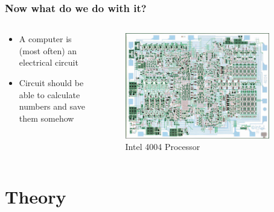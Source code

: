 \documentclass{beamer}
\begin{document}
\begin{frame}\frametitle{Now what do we do with it?}
  \begin{columns}
  \begin{column}{6cm}
  \begin{itemize}
   \item A computer is (most often) an electrical circuit
   \item Circuit should be able to calculate numbers and save them somehow
  \end{itemize}


  \end{column}
  \begin{column}{6cm}
  \begin{figure}
  \includegraphics[width=0.9\textwidth]{4004}
  \caption{Intel 4004 Processor}
  \end{figure}
  \end{column}
  \end{columns}
\end{frame}

\section{Theory}
\end{document}
